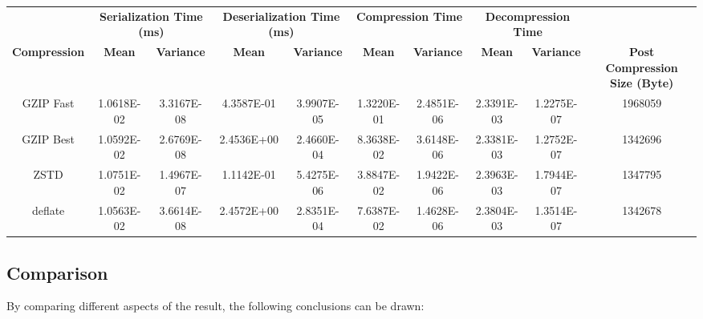 \begin{table}[h]
\centering
\begin{tabular}{cccccccccc}
\hline
 &
  \multicolumn{2}{c}{\textbf{Serialization Time (ms)}} &
  \multicolumn{2}{c}{\textbf{Deserialization Time (ms)}} &
  \multicolumn{2}{c}{\textbf{Compression Time}} &
  \multicolumn{2}{c}{\textbf{Decompression Time}} &
   \\
\textbf{Compression} & \textbf{Mean}     & \textbf{Variance} & \textbf{Mean}     & \textbf{Variance} & \textbf{Mean}     & \textbf{Variance} & \textbf{Mean}     & \textbf{Variance} & \textbf{Post Compression Size (Byte)} \\
\hline
GZIP Fast           & 1.0618E-02 & 3.3167E-08 & 4.3587E-01 & 3.9907E-05 & 1.3220E-01 & 2.4851E-06 & 2.3391E-03 & 1.2275E-07 & 1968059 \\
GZIP Best           & 1.0592E-02 & 2.6769E-08 & 2.4536E+00 & 2.4660E-04 & 8.3638E-02 & 3.6148E-06 & 2.3381E-03 & 1.2752E-07 & 1342696 \\
ZSTD                & 1.0751E-02 & 1.4967E-07 & 1.1142E-01 & 5.4275E-06 & 3.8847E-02 & 1.9422E-06 & 2.3963E-03 & 1.7944E-07 & 1347795 \\
deflate             & 1.0563E-02 & 3.6614E-08 & 2.4572E+00 & 2.8351E-04 & 7.6387E-02 & 1.4628E-06 & 2.3804E-03 & 1.3514E-07 & 1342678 \\
\hline
\end{tabular}
\end{table}

\subsection{Comparison}
By comparing different aspects of the result, the following conclusions can be drawn: 

